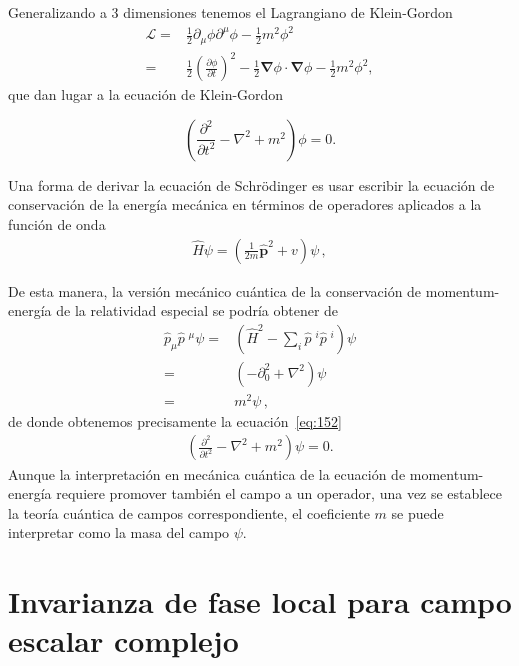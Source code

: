 Generalizando a 3 dimensiones tenemos el Lagrangiano de Klein-Gordon
\begin{align}
  \label{eq:15}
  \mathcal{L}=&\frac12 \partial_{\mu}\phi\partial^{\mu}\phi-\frac12 m^2\phi^{2}\nonumber\\
=&\frac{1}{2}
  \left(
\frac{\partial\phi}{\partial t}
  \right)^2-\tfrac{1}{2}\boldsymbol{\nabla}\phi\cdot\boldsymbol{\nabla}\phi-\tfrac{1}{2}m^2\phi^2,
\end{align}
que dan lugar a la ecuaci\'on de Klein-Gordon

\begin{equation}
\label{eq:152}
  \left(
\frac{\partial^2}{\partial t^2}-\nabla^2+m^2
  \right)\phi=0.
\end{equation}

Una forma de derivar la ecuación de Schr\"odinger es usar escribir la ecuación de conservación de la energía mecánica en términos de operadores aplicados a la función de onda
\begin{align}
  \widehat{H}\psi=\left( \frac{1}{2m}\widehat{\mathbf{p}}^{2}+v \right)\psi\,,
\end{align}

De esta manera, la versión mecánico cuántica de la conservación de momentum-energía de la relatividad especial se podría obtener de
\begin{align}
  \widehat{p}_{\mu}\widehat{p}\;^{\mu}\psi=&\left( \widehat{H}^{2}-\sum_{i}\widehat{p}\;^i\widehat{p}\;^i \right)\psi \nonumber\\
=&\left( -\partial_0^2+\nabla^2 \right)\psi \nonumber\\
=& m^2 \psi\,,
\end{align}
de donde obtenemos precisamente la ecuación~\eqref{eq:152}
\begin{align}
  \left(
\frac{\partial^2}{\partial t^2}-\nabla^2+m^2
  \right)\psi=0.
\end{align}
Aunque la interpretación en mecánica cuántica de la ecuación de momentum-energía requiere promover también el campo a un operador, una vez se establece la teoría cuántica de campos correspondiente, el coeficiente $m$ se puede interpretar como la masa del campo $\psi$.


\section{Invarianza de fase local para campo escalar complejo}

